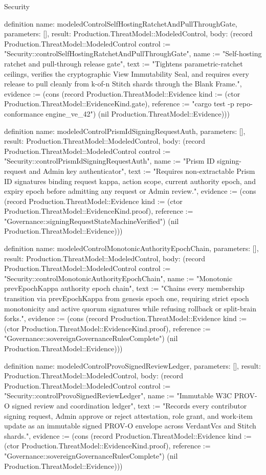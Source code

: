 \begin{lexlean}{Security}
\begin{semanticmodule}
definition{
  name: modeledControlSelfHostingRatchetAndPullThroughGate,
  parameters: [],
  result: Production.ThreatModel::ModeledControl,
  body: (record Production.ThreatModel::ModeledControl {control := "Security::controlSelfHostingRatchetAndPullThroughGate", name := "Self-hosting ratchet and pull-through release gate", text := "Tightens parametric-ratchet ceilings, verifies the cryptographic View Immutability Seal, and requires every release to pull cleanly from k-of-n Stitch shards through the Blank Frame.", evidence := (cons (record Production.ThreatModel::Evidence {kind := (ctor Production.ThreatModel::EvidenceKind.gate), reference := "cargo test -p repo-conformance engine_ve_42"}) (nil Production.ThreatModel::Evidence))})
}

definition{
  name: modeledControlPrismIdSigningRequestAuth,
  parameters: [],
  result: Production.ThreatModel::ModeledControl,
  body: (record Production.ThreatModel::ModeledControl {control := "Security::controlPrismIdSigningRequestAuth", name := "Prism ID signing-request and Admin key authenticator", text := "Requires non-extractable Prism ID signatures binding request kappa, action scope, current authority epoch, and expiry epoch before admitting any request or Admin review.", evidence := (cons (record Production.ThreatModel::Evidence {kind := (ctor Production.ThreatModel::EvidenceKind.proof), reference := "Governance::signingRequestStateMachineVerified"}) (nil Production.ThreatModel::Evidence))})
}

definition{
  name: modeledControlMonotonicAuthorityEpochChain,
  parameters: [],
  result: Production.ThreatModel::ModeledControl,
  body: (record Production.ThreatModel::ModeledControl {control := "Security::controlMonotonicAuthorityEpochChain", name := "Monotonic prevEpochKappa authority epoch chain", text := "Chains every membership transition via prevEpochKappa from genesis epoch one, requiring strict epoch monotonicity and active quorum signatures while refusing rollback or split-brain forks.", evidence := (cons (record Production.ThreatModel::Evidence {kind := (ctor Production.ThreatModel::EvidenceKind.proof), reference := "Governance::sovereignGovernanceRulesComplete"}) (nil Production.ThreatModel::Evidence))})
}

definition{
  name: modeledControlProvoSignedReviewLedger,
  parameters: [],
  result: Production.ThreatModel::ModeledControl,
  body: (record Production.ThreatModel::ModeledControl {control := "Security::controlProvoSignedReviewLedger", name := "Immutable W3C PROV-O signed review and coordination ledger", text := "Records every contributor signing request, Admin approve or reject attestation, role grant, and work-item update as an immutable signed PROV-O envelope across VerdantVcs and Stitch shards.", evidence := (cons (record Production.ThreatModel::Evidence {kind := (ctor Production.ThreatModel::EvidenceKind.proof), reference := "Governance::sovereignGovernanceRulesComplete"}) (nil Production.ThreatModel::Evidence))})
}


\end{semanticmodule}
\end{lexlean}
